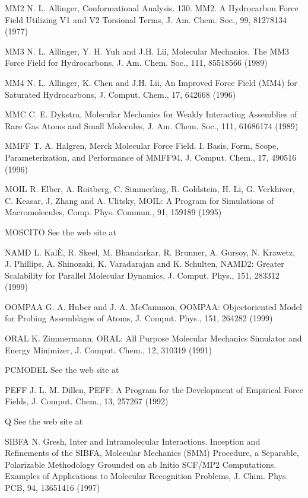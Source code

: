 \documentclass[letterpaper,11pt,english]{sphinxmanual}
\begin{document}
MM2     N. L. Allinger, Conformational Analysis. 130. MM2. A Hydrocarbon Force Field Utilizing V1 and V2 Torsional Terms, J. Am. Chem. Soc., 99, 8127\sphinxhyphen{}8134 (1977)

MM3     N. L. Allinger, Y. H. Yuh and J.\sphinxhyphen{}H. Lii, Molecular Mechanics. The MM3 Force Field for Hydrocarbons, J. Am. Chem. Soc., 111, 8551\sphinxhyphen{}8566 (1989)

MM4     N. L. Allinger, K. Chen and J.\sphinxhyphen{}H. Lii, An Improved Force Field (MM4) for Saturated Hydrocarbons, J. Comput. Chem., 17, 642\sphinxhyphen{}668 (1996)

MMC     C. E. Dykstra, Molecular Mechanics for Weakly Interacting Assemblies of Rare Gas Atoms and Small Molecules, J. Am. Chem. Soc., 111, 6168\sphinxhyphen{}6174 (1989)

MMFF     T. A. Halgren, Merck Molecular Force Field. I. Basis, Form, Scope, Parameterization, and Performance of MMFF94, J. Comput. Chem., 17, 490\sphinxhyphen{}516 (1996)

MOIL     R. Elber, A. Roitberg, C. Simmerling, R. Goldstein, H. Li, G. Verkhiver, C. Keasar, J. Zhang and A. Ulitsky, MOIL: A Program for Simulations of Macromolecules, Comp. Phys. Commun., 91, 159\sphinxhyphen{}189 (1995)

MOSCITO     See the web site at 

NAMD     L. KalÈ, R. Skeel, M. Bhandarkar, R. Brunner, A. Gursoy, N. Krawetz, J. Phillips, A. Shinozaki, K. Varadarajan and K. Schulten, NAMD2: Greater Scalability for Parallel Molecular Dynamics, J. Comput. Phys., 151, 283\sphinxhyphen{}312 (1999)

OOMPAA     G. A. Huber and J. A. McCammon, OOMPAA: Object\sphinxhyphen{}oriented Model for Probing Assemblages of Atoms, J. Comput. Phys., 151, 264\sphinxhyphen{}282 (1999)

ORAL     K. Zimmermann, ORAL: All Purpose Molecular Mechanics Simulator and Energy Minimizer, J. Comput. Chem., 12, 310\sphinxhyphen{}319 (1991)

PCMODEL     See the web site at 

PEFF     J. L. M. Dillen, PEFF: A Program for the Development of Empirical Force Fields, J. Comput. Chem., 13, 257\sphinxhyphen{}267 (1992)

Q     See the web site at 

SIBFA     N. Gresh, Inter\sphinxhyphen{} and Intramolecular Interactions. Inception and Refinements of the SIBFA, Molecular Mechanics (SMM) Procedure, a Separable, Polarizable Methodology Grounded on ab Initio SCF/MP2 Computations. Examples of Applications to Molecular Recognition Problems, J. Chim. Phys. PCB, 94, 1365\sphinxhyphen{}1416 (1997)
\end{document}
